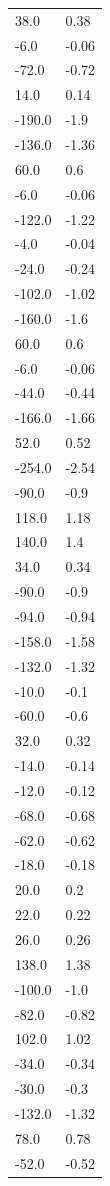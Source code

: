 \begin{longtable}{ll}
38.0 & 0.38 \\
-6.0 & -0.06 \\
-72.0 & -0.72 \\
14.0 & 0.14 \\
-190.0 & -1.9 \\
-136.0 & -1.36 \\
60.0 & 0.6 \\
-6.0 & -0.06 \\
-122.0 & -1.22 \\
-4.0 & -0.04 \\
-24.0 & -0.24 \\
-102.0 & -1.02 \\
-160.0 & -1.6 \\
60.0 & 0.6 \\
-6.0 & -0.06 \\
-44.0 & -0.44 \\
-166.0 & -1.66 \\
52.0 & 0.52 \\
-254.0 & -2.54 \\
-90.0 & -0.9 \\
118.0 & 1.18 \\
140.0 & 1.4 \\
34.0 & 0.34 \\
-90.0 & -0.9 \\
-94.0 & -0.94 \\
-158.0 & -1.58 \\
-132.0 & -1.32 \\
-10.0 & -0.1 \\
-60.0 & -0.6 \\
32.0 & 0.32 \\
-14.0 & -0.14 \\
-12.0 & -0.12 \\
-68.0 & -0.68 \\
-62.0 & -0.62 \\
-18.0 & -0.18 \\
20.0 & 0.2 \\
22.0 & 0.22 \\
26.0 & 0.26 \\
138.0 & 1.38 \\
-100.0 & -1.0 \\
-82.0 & -0.82 \\
102.0 & 1.02 \\
-34.0 & -0.34 \\
-30.0 & -0.3 \\
-132.0 & -1.32 \\
78.0 & 0.78 \\
-52.0 & -0.52 \\

\end{longtable}
